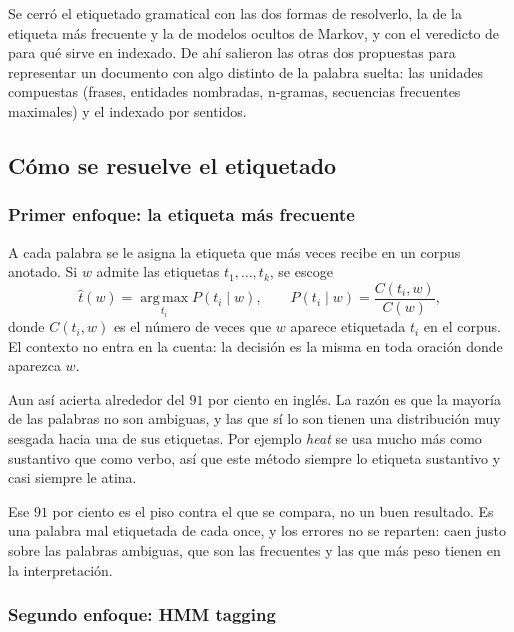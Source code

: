 \documentclass[11pt,letterpaper]{article}
\begin{document}
\begin{quick_sum}
    Se cerró el etiquetado gramatical con las dos formas de resolverlo,
    la de la etiqueta más frecuente y la de modelos ocultos de Markov,
    y con el veredicto de para qué sirve en indexado.
    De ahí salieron las otras dos propuestas para representar un
    documento con algo distinto de la palabra suelta: las unidades
    compuestas (frases, entidades nombradas, n-gramas, secuencias
    frecuentes maximales) y el indexado por sentidos.
\end{quick_sum}

\subsection*{Cómo se resuelve el etiquetado}

\subsubsection*{Primer enfoque: la etiqueta más frecuente}

A cada palabra se le asigna la etiqueta que más veces recibe en un
corpus anotado. Si $w$ admite las etiquetas $t_1, \ldots, t_k$, se
escoge
\[
    \hat{t}(w) = \operatorname*{arg\,max}_{t_i} P(t_i \mid w) ,
    \qquad
    P(t_i \mid w) = \frac{C(t_i, w)}{C(w)} ,
\]
donde $C(t_i, w)$ es el número de veces que $w$ aparece etiquetada
$t_i$ en el corpus. El contexto no entra en la cuenta: la decisión es
la misma en toda oración donde aparezca $w$.

Aun así acierta alrededor del $91$ por ciento en inglés. La razón es
que la mayoría de las palabras no son ambiguas, y las que sí lo son
tienen una distribución muy sesgada hacia una de sus etiquetas. Por
ejemplo \textit{heat} se usa mucho más como sustantivo que como verbo,
así que este método siempre lo etiqueta sustantivo y casi siempre le
atina.

\begin{ojo}
    Ese $91$ por ciento es el piso contra el que se compara, no un
    buen resultado. Es una palabra mal etiquetada de cada once, y los
    errores no se reparten: caen justo sobre las palabras ambiguas,
    que son las frecuentes y las que más peso tienen en la
    interpretación.
\end{ojo}

\subsubsection*{Segundo enfoque: HMM tagging}
\end{document}
